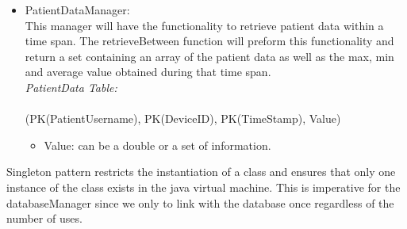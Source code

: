 \begin{itemize}
\item PatientDataManager:\\
This manager will have the functionality to retrieve patient data within a time span. The retrieveBetween function will preform this functionality and return a set containing an array of the patient data as well as the max, min and average value obtained during that time span.\\


	\emph{PatientData Table:}\\\\
		(PK(PatientUsername), PK(DeviceID), PK(TimeStamp), Value)\\
		\begin{itemize}
			\item Value: can be a double or a set of information.\\
		\end{itemize}
\end{itemize}		
	

Singleton pattern restricts the instantiation of a class and ensures that only one instance of the class exists in the java virtual machine. This is imperative for the databaseManager since we only to link with the database once regardless of the number of uses.

		
		
